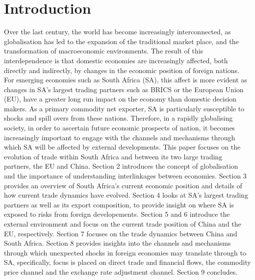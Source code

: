 \documentclass[11pt,preprint, authoryear]{elsarticle}
\numberwithin{equation}{section}
\numberwithin{figure}{section}
\numberwithin{table}{section}
\begin{document}

\headsep 35pt %




\hypertarget{introduction}{%
\section{\texorpdfstring{Introduction
\label{Introduction}}{Introduction }}\label{introduction}}

Over the last century, the world has become increasingly interconnected,
as globalisation has led to the expansion of the traditional market
place, and the transformation of macroeconomic environments. The result
of this interdependence is that domestic economies are increasingly
affected, both directly and indirectly, by changes in the economic
position of foreign nations. For emerging economies such as South Africa
(SA), this affect is more evident as changes in SA's largest trading
partners such as BRICS or the European Union (EU), have a greater long
run impact on the economy than domestic decision makers. As a primary
commodity net exporter, SA is particularly susceptible to shocks and
spill overs from these nations. Therefore, in a rapidly globalising
society, in order to ascertain future economic prospects of nation, it
becomes increasingly important to engage with the channels and
mechanisms through which SA will be affected by external developments.
This paper focuses on the evolution of trade within South Africa and
between its two large trading partners, the EU and China. Section 2
introduces the concept of globalisation and the importance of
understanding interlinkages between economies. Section 3 provides an
overview of South Africa's current economic position and details of how
current trade dynamics have evolved. Section 4 looks at SA's largest
trading partners as well as its export composition, to provide insight
on where SA is exposed to risks from foreign developements. Section 5
and 6 introduce the external environment and focus on the current trade
position of China and the EU, respectively. Section 7 focuses on the
trade dynamics between China and South Africa. Section 8 provides
insights into the channels and mechanisms through which unexpected
shocks in foreign economies may translate through to SA, specifically,
focus is placed on direct trade and financial flows, the commodity price
channel and the exchange rate adjustment channel. Section 9 concludes.
\end{document}
